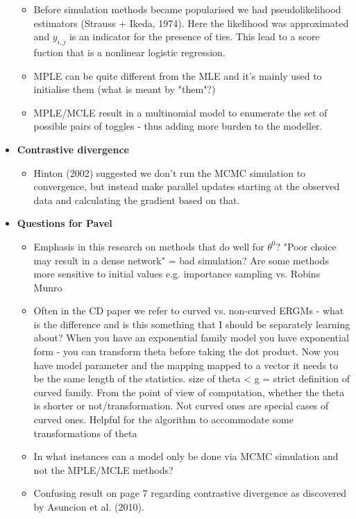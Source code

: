 \begin{itemize}
    \begin{itemize}
        \item Before simulation methods became popularised we had pseudolikelihood estimators (Strauss + Ikeda, 1974). Here the likelihood was approximated and $y_{i,j}$ is an indicator for the presence of ties. This lead to a score fuction that is a nonlinear logistic regression.
        \item MPLE can be quite different from the MLE and it's mainly used to initialise them (what is meant by "them"?)
        \item MPLE/MCLE result in a multinomial model to enumerate the set of possible pairs of toggles - thus adding more burden to the modeller.
    \end{itemize}
    \item \textbf{Contrastive divergence}
    \begin{itemize}
        \item Hinton (2002) suggested we don't run the MCMC simulation to convergence, but instead make parallel updates starting at the observed data and calculating the gradient based on that.
    \end{itemize}
    \item \textbf{Questions for Pavel}
    \begin{itemize}
    \item Emphasis in this research on methods that do well for $\theta^{0}$? "Poor choice may result in a dense network" = bad simulation?
    Are some methods more sensitive to initial values e.g. importance sampling vs. Robins Munro
    \item Often in the CD paper we refer to curved vs. non-curved ERGMs - what is the difference and is this something that I should be separately learning about?
    When you have an exponential family model you have exponential form - you can transform theta before taking the dot product. Now you have model parameter and the mapping mapped to a vector it needs to be the same length of the statistics. size of theta < g = strict definition of curved family. From the point of view of computation, whether the theta is shorter or not/transformation. Not curved ones are special cases of curved ones. Helpful for the algorithm to accommodate some transformations of theta
    \item In what instances can a model only be done via MCMC simulation and not the MPLE/MCLE methods?
    \item Confusing result on page 7 regarding contrastive divergence as discovered by Asuncion et al. (2010).

\end{itemize}
\end{itemize}
